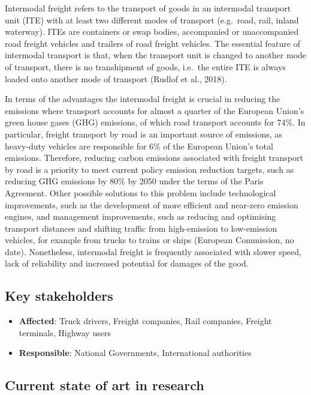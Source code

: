 \documentclass[
]{book}
\providecommand{\tightlist}{%
  \setlength{\itemsep}{0pt}\setlength{\parskip}{0pt}}
\begin{document}
Intermodal freight refers to the transport of goods in an intermodal transport unit (ITE) with at least two different modes of transport (e.g.~road, rail, inland waterway). ITEs are containers or swap bodies, accompanied or unaccompanied road freight vehicles and trailers of road freight vehicles. The essential feature of intermodal transport is that, when the transport unit is changed to another mode of transport, there is no transhipment of goods, i.e.~the entire ITE is always loaded onto another mode of transport (Rudlof et al., 2018).

In terms of the advantages the intermodal freight is crucial in reducing the emissions where transport accounts for almost a quarter of the European Union's green house gases (GHG) emissions, of which road transport accounts for 74\%. In particular, freight transport by road is an important source of emissions, as heavy-duty vehicles are responsible for 6\% of the European Union's total emissions. Therefore, reducing carbon emissions associated with freight transport by road is a priority to meet current policy emission reduction targets, such as reducing GHG emissions by 80\% by 2050 under the terms of the Paris Agreement. Other possible solutions to this problem include technological improvements, such as the development of more efficient and near-zero emission engines, and management improvements, such as reducing and optimising transport distances and shifting traffic from high-emission to low-emission vehicles, for example from trucks to trains or ships (European Commission, no date). Nonetheless, intermodal freight is frequently associated with slower speed, lack of reliability and increased potential for damages of the good.

\hypertarget{key-stakeholders-29}{%
\subsection*{Key stakeholders}\label{key-stakeholders-29}}

\begin{itemize}
\tightlist
\item
  \textbf{Affected}: Truck drivers, Freight companies, Rail companies, Freight terminals, Highway users
\item
  \textbf{Responsible}: National Governments, International authorities
\end{itemize}

\hypertarget{current-state-of-art-in-research-29}{%
\subsection*{Current state of art in research}\label{current-state-of-art-in-research-29}}
\end{document}
